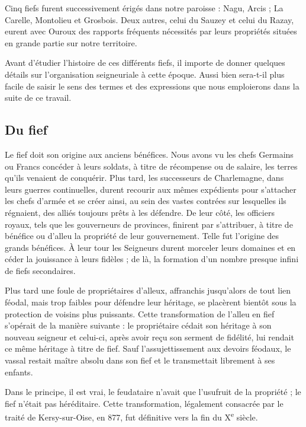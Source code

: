 \documentclass[11pt,a4paper]{report}
\begin{document}
Cinq fiefs furent successivement érigés dans notre paroisse : Nagu, Arcis ; La
Carelle, Montolieu et Grosbois. Deux autres, celui du Sauzey et celui du Razay,
eurent avec Ouroux des rapports fréquents nécessités par leurs propriétés situées
en grande partie sur notre territoire.

Avant d'étudier l'histoire de ces différents fiefs, il importe de donner
quelques détails sur l'organisation seigneuriale à cette époque. Aussi bien
sera-t-il plus facile de saisir le sens des termes et des expressions que nous
emploierons dans la suite de ce travail.

\begingroup
\setlength{\parskip}{0pt}
\subsection*{Du fief}

Le fief doit son origine aux anciens bénéfices. Nous avons vu les chefs Germains
ou Francs concéder à leurs soldats, à titre de récompense ou de salaire, les
terres qu'ils venaient de conquérir. Plus tard, les successeurs de Charlemagne,
dans leurs guerres continuelles, durent recourir aux mêmes expédients pour
s'attacher les chefs d'armée et se créer ainsi, au sein des vastes contrées sur
lesquelles ils régnaient, des alliés toujours prêts à les défendre. De leur côté,
les officiers royaux, tels que les gouverneurs de provinces, finirent par
s'attribuer, à titre de bénéfice ou d'alleu la propriété de leur gouvernement.
Telle fut l'origine des grands bénéfices. À leur tour les Seigneurs durent
morceler leurs domaines et en céder la jouissance à leurs fidèles ; de là, la
formation d'un nombre presque infini de fiefs secondaires.

Plus tard une foule de propriétaires d'alleux, affranchis jusqu'alors de tout lien
féodal, mais trop faibles pour défendre leur héritage, se placèrent bientôt sous
la protection de voisins plus puissants. Cette transformation de l'alleu en fief
s'opérait de la manière suivante : le propriétaire cédait son héritage à son
nouveau seigneur et celui-ci, après avoir reçu son serment de fidélité, lui
rendait ce même héritage à titre de fief. Sauf l'assujettissement aux devoirs
féodaux, le vassal restait maître absolu dans son fief et le transmettait
librement à ses enfants.

Dans le principe, il est vrai, le feudataire n'avait que l'usufruit de la
propriété ; le fief n'était pas héréditaire. Cette transformation, légalement
consacrée par le traité de Kersy-sur-Oise, en 877, fut définitive vers la fin du
X\textsuperscript{e} siècle.
\end{document}
